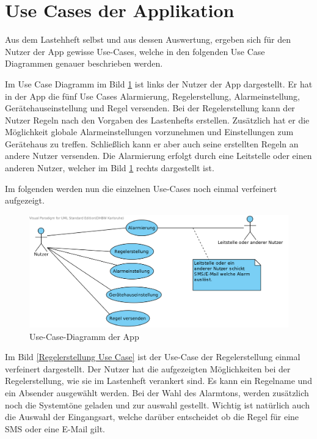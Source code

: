 \section{Use Cases der Applikation}
\label{Use Case Diagramme}
Aus dem Lastehheft selbst und aus dessen Auswertung, ergeben sich f\"ur den Nutzer der App gewisse Use-Cases, welche in den folgenden Use Case Diagrammen genauer beschrieben werden.

Im Use Case Diagramm im Bild \ref{Main Use Case} ist links der Nutzer der App dargestellt. Er hat in der App die f\"unf Use Cases Alarmierung, Regelerstellung, Alarmeinstellung, Ger\"atehauseinstellung und Regel versenden. Bei der Regelerstellung kann der Nutzer Regeln nach den Vorgaben des Lastenhefts erstellen. Zus\"atzlich hat er die M\"oglichkeit globale Alarmeinstellungen vorzunehmen und Einstellungen zum Ger\"atehaus zu treffen. Schlie\ss{}lich kann er aber auch seine erstellten Regeln an andere Nutzer versenden. 
Die Alarmierung erfolgt durch eine Leitstelle oder einen anderen Nutzer, welcher im Bild \ref{Main Use Case} rechts dargestellt ist.

Im folgenden werden nun die einzelnen Use-Cases noch einmal verfeinert aufgezeigt.
\begin{figure}[!ht]
\centering
\includegraphics[width=16cm]{Bilder/AlarmSMS_App.png}
\caption{Use-Case-Diagramm der App}
\label{Main Use Case}
\centering
\end{figure}

Im Bild \ref{Regelerstellung Use Case} ist der Use-Case der Regelerstellung einmal verfeinert dargestellt. Der Nutzer hat die aufgezeigten M\"oglichkeiten bei der Regelerstellung, wie sie im Lastenheft verankert sind. Es kann ein Regelname und ein Absender ausgew\"ahlt werden. Bei der Wahl des Alarmtons, werden zus\"atzlich noch die Systemt\"one geladen und zur auswahl gestellt. Wichtig ist nat\"urlich auch die Auswahl der Eingangsart, welche dar\"uber entscheidet ob die Regel f\"ur eine SMS oder eine E-Mail gilt. 

